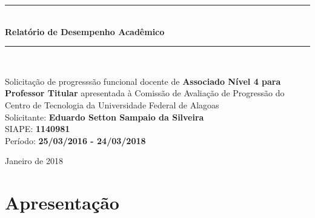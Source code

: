 \documentclass[a4paper,oneside,10pt]{article}
\begin{document}
\begin{titlepage}

\vspace{-5.0cm}

\begin{figure}[!htb]
 \label{fig:UFAL_CTEC_logo}
\end{figure}

\begin{center}
\vspace{1cm}
\rule{1.0\textwidth}{1pt} \\ [0.5cm]
{\Huge \textbf{\textsf{Relatório de Desempenho Acadêmico}}} \\
\rule{1.0\textwidth}{1pt} \\
\vspace{2cm}

\doublespacing
{\Large \textsf{Solicitação de progresssão funcional docente de \textbf{Associado Nível 4 para Professor Titular} apresentada à Comissão de Avaliação de Progressão do Centro de Tecnologia da Universidade Federal de Alagoas}}\\
\vspace{1.5cm}
{\LARGE \textsf{Solicitante: \textbf{Eduardo Setton Sampaio da Silveira}}}\\
\vspace{0.5cm}
{\Large \textsf{SIAPE: \textbf{1140981}}} \\
\vspace{0.5cm}
{\Large \textsf{Período: \textbf{25/03/2016 - 24/03/2018}}} \\

\vspace{2.0cm}

\normalsize \textsf{Janeiro de 2018}

\end{center}
\thispagestyle{empty}
\end{titlepage}

\tableofcontents


\newpage
\section*{Apresentação}
\vspace{0.3cm}
\end{document}
